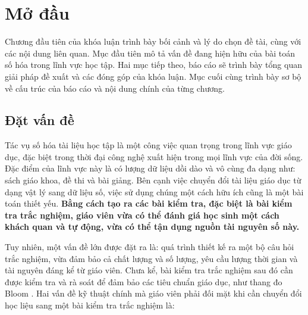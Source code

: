 \chapter{Mở đầu}
\label{chap:mo-dau}

Chương đầu tiên của khóa luận trình bày bối cảnh và lý do chọn đề tài, cùng với các nội dung liên quan. Mục đầu tiên mô tả vấn đề đang hiện hữu của bài toán số hóa trong lĩnh vực học tập. Hai mục tiếp theo, báo cáo sẽ trình bày tổng quan giải pháp đề xuất và các đóng góp của khóa luận. Mục cuối cùng trình bày sơ bộ về cấu trúc của báo cáo và nội dung chính của từng chương.

\section{Đặt vấn đề}

Tác vụ số hóa tài liệu học tập là một công việc quan trọng trong lĩnh vực giáo dục, đặc biệt trong thời đại công nghệ xuất hiện trong mọi lĩnh vực của đời sống. Đặc điểm của lĩnh vực này là có lượng dữ liệu dồi dào và vô cùng đa dạng như: sách giáo khoa, đề thi và bài giảng. Bên cạnh việc chuyển đổi tài liệu giáo dục từ dạng vật lý sang dữ liệu số, việc sử dụng chúng một cách hữu ích cũng là một bài toán thiết yếu. \textbf{Bằng cách tạo ra các bài kiểm tra, đặc biệt là bài kiểm tra trắc nghiệm, giáo viên vừa có thể đánh giá học sinh một cách khách quan và tự động, vừa có thể tận dụng nguồn tài nguyên số này.}

Tuy nhiên, một vấn đề lớn được đặt ra là: quá trình thiết kế ra một bộ câu hỏi trắc nghiệm, vừa đảm bảo cả chất lượng và số lượng, yêu cầu lượng thời gian và tài nguyên đáng kể từ giáo viên. Chưa kể, bài kiểm tra trắc nghiệm sau đó cần được kiểm tra và rà soát để đảm bảo các tiêu chuẩn giáo dục, như thang đo Bloom \cite{bloom1956taxonomy}. Hai vấn đề kỹ thuật chính mà giáo viên phải đối mặt khi cần chuyển đổi học liệu sang một bài kiểm tra trắc nghiệm là:

